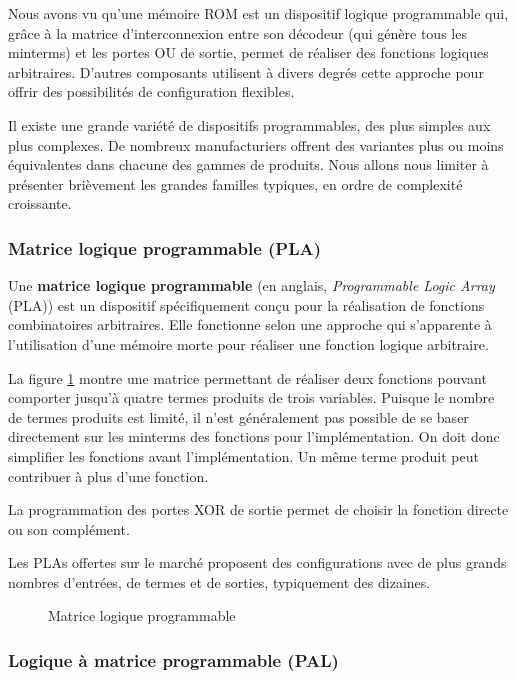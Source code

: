 \documentclass[11pt]{article}
\begin{document}
Nous avons vu qu'une mémoire ROM est un dispositif logique
programmable qui, grâce à la matrice d'interconnexion entre son
décodeur (qui génère tous les minterms) et les portes OU de sortie,
permet de réaliser des fonctions logiques arbitraires. D'autres
composants utilisent à divers degrés cette approche pour offrir des
possibilités de configuration flexibles.

Il existe une grande variété de dispositifs programmables, des plus
simples aux plus complexes. De nombreux manufacturiers offrent des
variantes plus ou moins équivalentes dans chacune des gammes de
produits. Nous allons nous limiter à présenter brièvement les grandes
familles typiques, en ordre de complexité croissante.

\subsubsection{Matrice logique programmable (PLA)}
\label{sec:orge8c21ac}

Une \textbf{matrice logique programmable} (en anglais, \emph{Programmable Logic
Array} (PLA)) est un dispositif spécifiquement conçu pour la
réalisation de fonctions combinatoires arbitraires. Elle fonctionne
selon une approche qui s'apparente à l'utilisation d'une mémoire morte
pour réaliser une fonction logique arbitraire.

La figure \ref{fig:org932d8e7} montre une matrice permettant de
réaliser deux fonctions pouvant comporter jusqu'à quatre termes
produits de trois variables. Puisque le nombre de termes produits est
limité, il n'est généralement pas possible de se baser directement sur
les minterms des fonctions pour l'implémentation. On doit donc
simplifier les fonctions avant l'implémentation. Un même terme produit
peut contribuer à plus d'une fonction.

La programmation des portes XOR de sortie permet de choisir
la fonction directe ou son complément. 

Les PLAs offertes sur le marché proposent des configurations avec de
plus grands nombres d'entrées, de termes et de sorties, typiquement
des dizaines.

\begin{figure}[htbp]
\centering

\caption{\label{fig:org932d8e7}Matrice logique programmable}
\end{figure}

\subsubsection{Logique à matrice programmable (PAL)}
\label{sec:org8a17646}
\end{document}
